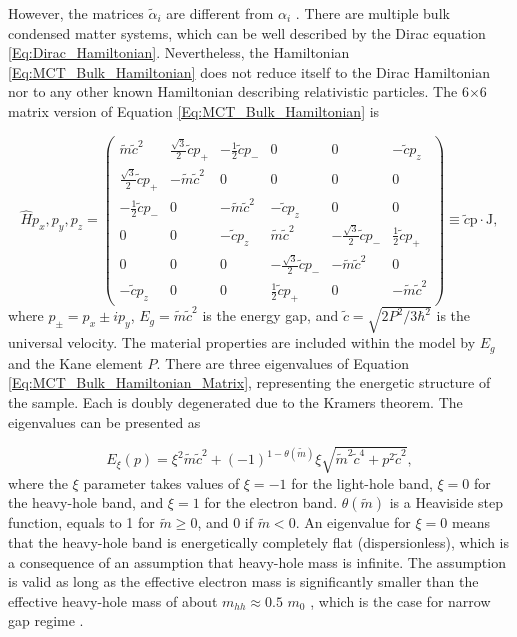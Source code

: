 \documentclass[titlepage,a4paper]{book}
\begin{document}
However, the matrices $\tilde{\alpha}_i$ are different from $\alpha_i$ \cite{Teppe_MCT}. There are multiple bulk condensed matter systems, which can be well described by the Dirac equation \ref{Eq:Dirac_Hamiltonian}. Nevertheless, the Hamiltonian \ref{Eq:MCT_Bulk_Hamiltonian} does not reduce itself to the Dirac Hamiltonian nor to any other known Hamiltonian describing relativistic particles. The 6$\times$6 matrix version of Equation \ref{Eq:MCT_Bulk_Hamiltonian} is

\begin{equation}
\label{Eq:MCT_Bulk_Hamiltonian_Matrix}
\hat{H}{p_x, p_y, p_z} = \left( \begin{array}{cccccc}
\tilde{m}\tilde{c}^2 & \frac{\sqrt{3}}{2}\tilde{c}{p_+} & -\frac{1}{2}\tilde{c}{p_{-}} & 0 & 0 & -\tilde{c}p_z \\
\frac{\sqrt{3}}{2}\tilde{c}{p_+} & -\tilde{m}\tilde{c}^2 & 0 & 0 & 0 & 0 \\
-\frac{1}{2}\tilde{c}{p_-} & 0 & -\tilde{m}\tilde{c}^2 & -\tilde{c}p_z & 0 & 0 \\
0 & 0 & -\tilde{c}p_z & \tilde{m}\tilde{c}^2 & -\frac{\sqrt{3}}{2}\tilde{c}{p_-} & \frac{1}{2}\tilde{c}{p_+} \\
0 & 0 & 0 & -\frac{\sqrt{3}}{2}\tilde{c}{p_-} & -\tilde{m}\tilde{c}^2 &0 \\
-\tilde{c}p_z & 0 & 0 & \frac{1}{2}\tilde{c}{p_+} & 0 & -\tilde{m}\tilde{c}^2 \end{array} \right) \equiv \tilde{c}\boldsymbol{\mathrm{p}} \cdot \boldsymbol{\mathrm{J}},
\end{equation}
where $p_{\pm} = p_x \pm ip_y$, $E_g = \tilde{m}\tilde{c}^2$ is the energy gap, and $\tilde{c} = \sqrt{2P^2 / 3 \hbar^2}$ is the universal velocity. The material properties are included within the model by $E_g$ and the Kane element $P$. There are three eigenvalues of Equation \ref{Eq:MCT_Bulk_Hamiltonian_Matrix}, representing the energetic structure of the sample. Each is doubly degenerated due to the Kramers theorem. The eigenvalues can be presented as

\begin{equation}
\label{Eq:MCT_eigenvalues}
E_\xi (p) = \xi^2 \tilde{m}\tilde{c}^2 + (-1)^{1-\theta (\tilde{m})} \xi \sqrt{\tilde{m}^2\tilde{c}^4 + p^2\tilde{c}^2},
\end{equation}
where the $\xi$ parameter takes values of $\xi = -1$ for the light-hole band, $\xi = 0$ for the heavy-hole band, and $\xi = 1$ for the electron band. $\theta(\tilde{m})$ is a Heaviside step function, equals to 1 for $\tilde{m} \geq 0$, and 0 if $\tilde{m} < 0$. An eigenvalue for $\xi = 0$ means that the heavy-hole band is energetically completely flat (dispersionless), which is a consequence of an assumption that heavy-hole mass is infinite. The assumption is valid as long as the effective electron mass is significantly smaller than the effective heavy-hole mass of about $m_{hh} \approx 0.5$ $m_0$ \cite{Weiler_MCT}, which is the case for narrow gap regime \cite{Orlita_MCT}. 
\end{document}
